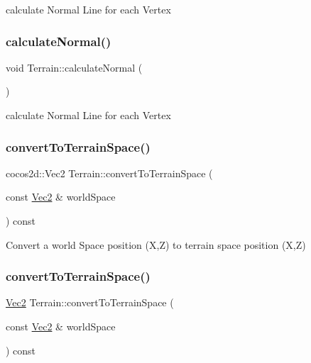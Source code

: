 calculate Normal Line for each Vertex \mbox{\label{classTerrain_a04237c044acd2918422e7654e18cd89b}} 
\subsubsection{\texorpdfstring{calculate\+Normal()}{calculateNormal()}\hspace{0.1cm}{\footnotesize\ttfamily [2/2]}}
{\footnotesize\ttfamily void Terrain\+::calculate\+Normal (\begin{DoxyParamCaption}{ }\end{DoxyParamCaption})\hspace{0.3cm}{\ttfamily [protected]}}

calculate Normal Line for each Vertex \mbox{\label{classTerrain_a04ad6684b37690325940bf7e44d2a817}} 
\subsubsection{\texorpdfstring{convert\+To\+Terrain\+Space()}{convertToTerrainSpace()}\hspace{0.1cm}{\footnotesize\ttfamily [1/2]}}
{\footnotesize\ttfamily cocos2d\+::\+Vec2 Terrain\+::convert\+To\+Terrain\+Space (\begin{DoxyParamCaption}\item[{const \hyperlink{classVec2}{Vec2} \&}]{world\+Space }\end{DoxyParamCaption}) const}

Convert a world Space position (X,Z) to terrain space position (X,Z) \mbox{\label{classTerrain_a03a69dd84d9889e9c5644cf23a63ad6f}} 
\subsubsection{\texorpdfstring{convert\+To\+Terrain\+Space()}{convertToTerrainSpace()}\hspace{0.1cm}{\footnotesize\ttfamily [2/2]}}
{\footnotesize\ttfamily \hyperlink{classVec2}{Vec2} Terrain\+::convert\+To\+Terrain\+Space (\begin{DoxyParamCaption}\item[{const \hyperlink{classVec2}{Vec2} \&}]{world\+Space }\end{DoxyParamCaption}) const}

